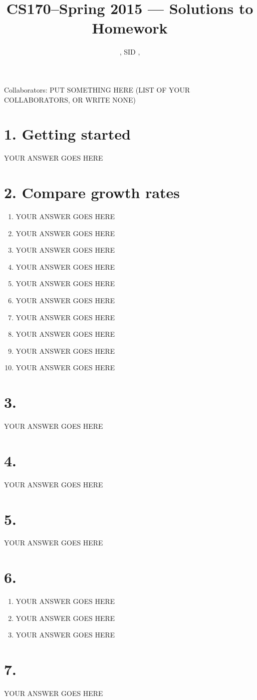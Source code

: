 \documentclass[11pt]{article}
\title{CS170--Spring 2015 --- Solutions to Homework \Homework}
\author{\Name, SID \SID, \texttt{\Login}}
\date{}
\newenvironment{qparts}{\begin{enumerate}[{(}a{)}]}{\end{enumerate}}
\begin{document}
\maketitle

Collaborators: PUT SOMETHING HERE (LIST OF YOUR COLLABORATORS, OR WRITE NONE)

\section*{1. Getting started}
YOUR ANSWER GOES HERE



\newpage
\section*{2. Compare growth rates}
\begin{qparts}
\item
YOUR ANSWER GOES HERE

\item
YOUR ANSWER GOES HERE

\item
YOUR ANSWER GOES HERE

\item
YOUR ANSWER GOES HERE

\item
YOUR ANSWER GOES HERE

\item
YOUR ANSWER GOES HERE

\item
YOUR ANSWER GOES HERE

\item
YOUR ANSWER GOES HERE

\item
YOUR ANSWER GOES HERE

\item
YOUR ANSWER GOES HERE
\end{qparts}


\newpage
\section*{3.}
YOUR ANSWER GOES HERE


\newpage
\section*{4.}
YOUR ANSWER GOES HERE


\newpage
\section*{5.}
YOUR ANSWER GOES HERE


\newpage
\section*{6.}
\begin{qparts}
\item
YOUR ANSWER GOES HERE

\item
YOUR ANSWER GOES HERE

\item
YOUR ANSWER GOES HERE
\end{qparts}


\newpage
\section*{7.}
YOUR ANSWER GOES HERE
\end{document}

